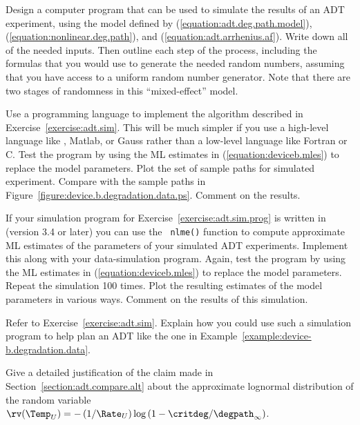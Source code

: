 \begin{exercise}
\label{exercise:adt.sim}
Design a computer program that can be used to simulate the results of
an ADT experiment, using the model defined by
(\ref{equation:adt.deg.path.model}),
(\ref{equation:nonlinear.deg.path}), and
(\ref{equation:adt.arrhenius.af}).  Write down all of the needed
inputs. Then outline each step of the process, including the formulas
that you would use to generate the needed random numbers, assuming
that you have access to a uniform random number generator. Note that
there are two stages of randomness in this ``mixed-effect'' model.
\end{exercise}

\begin{exercise2}
\label{exercise:adt.sim.prog}
Use a programming language to implement the algorithm described in
Exercise~\ref{exercise:adt.sim}. This will be much simpler if you use a
high-level language like \splus, Matlab, or Gauss rather than a
low-level language like Fortran or C.  Test the program by using the
ML estimates in (\ref{equation:deviceb.mles}) to replace the model
parameters.  Plot the set of sample paths for simulated experiment.
Compare with the sample paths in
Figure~\ref{figure:device.b.degradation.data.ps}. Comment on the
results.
\end{exercise2}

\begin{exercise2}
\label{exercise:adt.sim.ml.prog}
If your simulation program for Exercise~\ref{exercise:adt.sim.prog}
is written in \splus (version 3.4 or later) you can use the {\tt
nlme()} function to compute approximate ML estimates of the
parameters of your simulated ADT experiments. Implement this along
with your data-simulation program. Again, test the program by using
the ML estimates in (\ref{equation:deviceb.mles}) to replace the
model parameters.  Repeat the simulation 100 times. Plot the
resulting estimates of the model parameters in various ways. Comment
on the results of this simulation.
\end{exercise2}

\begin{exercise}
Refer to Exercise~\ref{exercise:adt.sim}. Explain how you could use
such a simulation program to help plan an ADT like the one in
Example~\ref{example:device-b.degradation.data}.
\end{exercise}


\begin{exercise1}
Give a detailed justification of the claim made in
Section~\ref{section:adt.compare.alt} about the approximate
lognormal distribution of the random variable ${\rv}(\Temp_{U})=- \,
(1/\Rate_{U})\log
\left(1-\critdeg/\degpath_{\infty} \right )$.
\end{exercise1}
